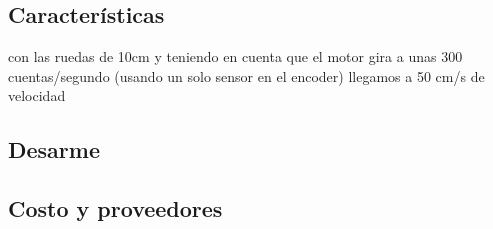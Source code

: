 \subsection{Caracter\'isticas}
\label{h_prototipo_caracteristicas}

con las ruedas de 10cm y teniendo en cuenta que el motor gira a unas 300 cuentas/segundo (usando un solo sensor en el encoder) llegamos a 50 cm/s de velocidad

\subsection{Desarme}
\label{h_prototipo_desarme}

\subsection{Costo y proveedores}
\label{h_prototipo_costo}
